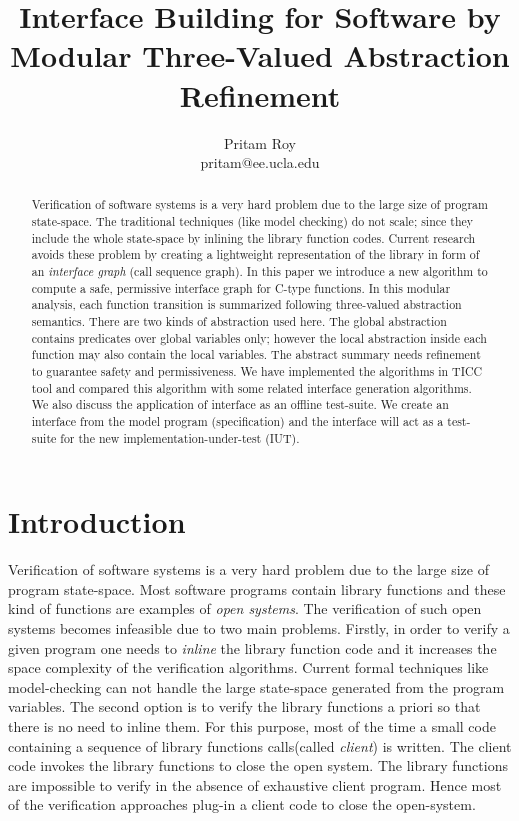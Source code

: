 \documentclass{llncs}
\author{Pritam Roy \\ pritam@ee.ucla.edu}
\institute{Computer Science and Electrical Engineering Department \\ 
University of California,Los Angeles, USA
}
\title{Interface Building for Software by Modular Three-Valued Abstraction Refinement}
\begin{document}
\maketitle
\begin{abstract}
Verification of software systems is a very hard problem due to the large size of program state-space.
The traditional techniques (like model checking) do not scale; since they include the whole state-space by inlining the library function codes.
Current research avoids these problem by creating a lightweight representation of the library in form of 
an {\em interface graph}  (call sequence graph).
In this paper we introduce a new algorithm  to compute a safe, 
permissive interface graph for C-type functions.
In this modular analysis, each function transition is summarized following three-valued abstraction semantics.
There are two kinds of abstraction used here.
The global abstraction contains predicates over global variables only; however the local abstraction 
inside each function may also contain the local variables.
The abstract summary needs refinement to guarantee safety and permissiveness.
We  have implemented the algorithms in TICC tool and compared this algorithm with some 
related interface generation algorithms. 
We also discuss the application of interface as an offline test-suite. 
We create an interface from the model program (specification)  and 
the interface will act as a test-suite for the new implementation-under-test (IUT).
\end{abstract}
\section{Introduction}

Verification of software systems is a very hard problem due to the large size of program state-space. 
Most software programs contain library functions and these kind of functions are examples of
\emph{open systems}.
The verification of such open systems becomes infeasible due to two main problems. 
Firstly, in order to verify a given program one needs to \emph{inline} the library function code and it increases the space complexity of the verification algorithms.
Current formal techniques like model-checking can not handle the large state-space generated 
from the  program variables.
The second option is to verify the library functions a priori so that there is no need to inline them.
For this purpose, most of the time a small code containing a sequence of library  functions calls(called \emph{client}) is written.
The client code invokes the library functions to close the open system. 
The library functions are impossible to verify in the absence of exhaustive client program. 
Hence most of the verification approaches plug-in a client code to close the open-system.  
\end{document}
